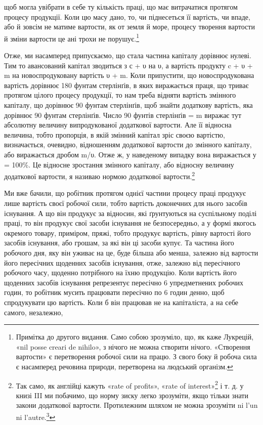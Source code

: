 \parcont{}  %
щоб могла увібрати в себе ту кількість праці, що має витрачатися протягом процесу продукції. Коли цю
масу дано, то, чи піднесеться її вартість, чи впаде, або й зовсім не матиме вартости, як от земля й
море, процесу творення вартости й зміни вартости це ані трохи не порушує.\footnote{
Примітка до другого видання. Само собою зрозуміло, що, як каже Лукрецій, «nil posse creari de
nihilo», з нічого не можна створити нічого. «Створення вартости» є перетворення робочої сили на
працю. З свого боку й робоча сила є насамперед речовина природи, перетворена на людський організм.
}

Отже, ми насамперед припускаємо, що стала частина капіталу дорівнює нулеві. Тим то авансований
капітал зводиться з с + υ на υ, а вартість продукту c + υ + m на новоспродуковану вартість υ + m.
Коли припустити, що новоспродукована вартість дорівнює 180 фунтам стерлінґів, в яких виражається
праця, що триває протягом цілого процесу продукції, то нам треба відняти вартість змінного капіталу,
що дорівнює 90 фунтам стерлінґів, щоб знайти
додаткову вартість, яка дорівнює 90 фунтам стерлінґів. Число 90 фунтів стерлінґів = m виражає тут
абсолютну величину випродукованої додаткової вартости. Але її відносна величина, тобто пропорція, в
якій змінний капітал зріс своєю вартістю, визначається, очевидно, відношенням додаткової вартости до
змінного капіталу, або виражається дробом m/υ. Отже ж, у наведеному випадку вона виражається у 
= 100\%. Це відносне зростання
змінного капіталу, або відносну величину додаткової вартости, я називаю нормою додаткової
вартости.\footnote{
Так само, як англійці кажуть «rate of profits», «rate of interest»\footnote*{
— «норма зиску», «норма процента». \emph{Ред.}
} і т. д. у книзі III ми
побачимо, що норму зиску легко зрозуміти, якщо тільки знати закони додаткової вартости. Протилежним
шляхом не можна зрозуміти ni l’un ni l’autre.\footnote*{
— ні того, ні другого. \emph{Ред.}
}
}

Ми вже бачили, що робітник протягом однієї частини процесу праці продукує лише вартість своєї
робочої сили, тобто вартість доконечних для нього засобів існування. А що він продукує за відносин,
які ґрунтуються на суспільному поділі праці, то він продукує свої засоби існування не безпосередньо,
а у формі якогось окремого товару, приміром, пряжі, тобто продукує вартість, рівну вартості його
засобів існування, або грошам, за які
він ці засоби купує. Та частина його робочого дня, яку він уживає на це, буде більша або менша,
залежно від вартости його пересічних щоденних засобів існування, отже, залежно від пересічного
робочого часу, щоденно потрібного на їхню продукцію. Коли вартість його щоденних засобів існування
репрезентує пересічно
6 упредметнених робочих годин, то робітник мусить працювати пересічно по 6 годин денно, щоб
спродукувати цю вартість. Коли б він працював не на капіталіста, а на себе самого, незалежно,
\parbreak{}  %
